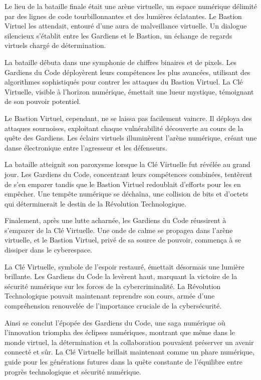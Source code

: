 \documentclass{./StyCls/MyArticle}
\begin{document}
Le lieu de la bataille finale était une arène virtuelle, un espace numérique délimité par des lignes de code tourbillonnantes et des lumières éclatantes. Le Bastion Virtuel les attendait, entouré d'une aura de malveillance virtuelle. Un dialogue silencieux s'établit entre les Gardiens et le Bastion, un échange de regards virtuels chargé de détermination.

La bataille débuta dans une symphonie de chiffres binaires et de pixels. Les Gardiens du Code déployèrent leurs compétences les plus avancées, utilisant des algorithmes sophistiqués pour contrer les attaques du Bastion Virtuel. La Clé Virtuelle, visible à l'horizon numérique, émettait une lueur mystique, témoignant de son pouvoir potentiel.

Le Bastion Virtuel, cependant, ne se laissa pas facilement vaincre. Il déploya des attaques sournoises, exploitant chaque vulnérabilité découverte au cours de la quête des Gardiens. Les éclairs virtuels illuminèrent l'arène numérique, créant une danse électronique entre l'agresseur et les défenseurs.

La bataille atteignit son paroxysme lorsque la Clé Virtuelle fut révélée au grand jour. Les Gardiens du Code, concentrant leurs compétences combinées, tentèrent de s'en emparer tandis que le Bastion Virtuel redoublait d'efforts pour les en empêcher. Une tempête numérique se déchaîna, une collision de bits et d'octets qui déterminerait le destin de la Révolution Technologique.

Finalement, après une lutte acharnée, les Gardiens du Code réussirent à s'emparer de la Clé Virtuelle. Une onde de calme se propagea dans l'arène virtuelle, et le Bastion Virtuel, privé de sa source de pouvoir, commença à se dissiper dans le cyberespace.

La Clé Virtuelle, symbole de l'espoir restauré, émettait désormais une lumière brillante. Les Gardiens du Code la levèrent haut, marquant la victoire de la sécurité numérique sur les forces de la cybercriminalité. La Révolution Technologique pouvait maintenant reprendre son cours, armée d'une compréhension renouvelée de l'importance cruciale de la cybersécurité.

Ainsi se conclut l'épopée des Gardiens du Code, une saga numérique où l'innovation triompha des éclipses numériques, montrant que même dans le monde virtuel, la détermination et la collaboration pouvaient préserver un avenir connecté et sûr. La Clé Virtuelle brillait maintenant comme un phare numérique, guide pour les générations futures dans la quête constante de l'équilibre entre progrès technologique et sécurité numérique.
\end{document}
